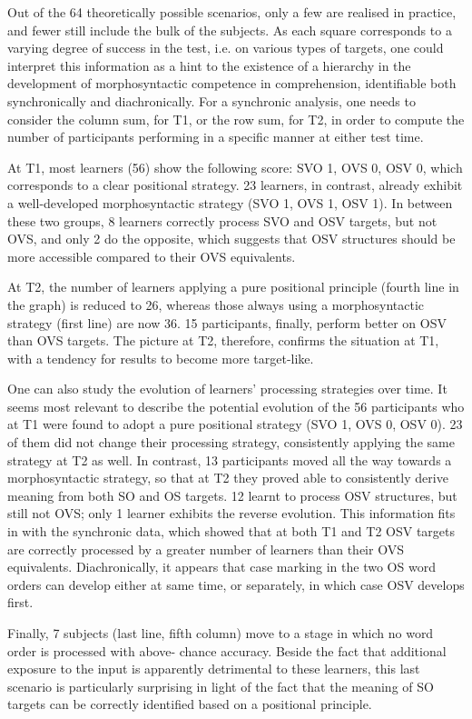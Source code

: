 Out of the 64 theoretically possible scenarios, only a few are realised in practice, and fewer still include the bulk of the subjects. As each square corresponds to a varying degree of success in the test, i.e. on various types of targets, one could interpret this information as a hint to the existence of a hierarchy in the development of morphosyntactic competence in comprehension, identifiable both synchronically and diachronically. For a synchronic analysis, one needs to consider the column sum, for T1, or the row sum, for T2, in order to compute the number of participants performing in a specific manner at either test time. 

At T1, most learners (56) show the following score: SVO 1, OVS 0, OSV 0, which corresponds to a clear positional strategy. 23 learners, in contrast, already exhibit a well-developed morphosyntactic strategy (SVO 1, OVS 1, OSV 1). In between these two groups, 8 learners correctly process SVO and OSV targets, but not OVS, and only 2 do the opposite, which suggests that OSV structures should be more accessible compared to their OVS equivalents. 

At T2, the number of learners applying a pure positional principle (fourth line in the graph) is reduced to 26, whereas those always using a morphosyntactic strategy (first line) are now 36. 15 participants, finally, perform better on OSV than OVS targets. The picture at T2, therefore, confirms the situation at T1, with a tendency for results to become more target-like.

One can also study the evolution of learners' processing strategies over time. It seems most relevant to describe the potential evolution of the 56 participants who at T1 were found to adopt a pure positional strategy (SVO 1, OVS 0, OSV 0). 23 of them did not change their processing strategy, consistently applying the same strategy at T2 as well. In contrast, 13 participants moved all the way towards a morphosyntactic strategy, so that at T2 they proved able to consistently derive meaning from both SO and OS targets. 12 learnt to process OSV structures, but still not OVS; only 1 learner exhibits the reverse evolution. This information fits in with the synchronic data, which showed that at both T1 and T2 OSV targets are correctly processed by a greater number of learners than their OVS equivalents. Diachronically, it appears that case marking in the two OS word orders can develop either at same time, or separately, in which case OSV develops first. 

Finally, 7 subjects (last line, fifth column) move to a stage in which no word order is processed with  above- chance accuracy. Beside the fact that additional exposure to the input is apparently detrimental to these learners, this last scenario is particularly surprising in light of the fact that the meaning of SO targets can be correctly identified based on a positional principle.


